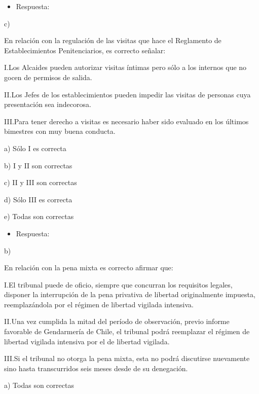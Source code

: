 \documentclass[letterpaper, 11pt]{article}
\begin{document}
\begin{itemize}
\item Respuesta:
\end{itemize}

c)


En relación con la regulación de las visitas que hace el Reglamento de
Establecimientos Penitenciarios, es correcto señalar:


I.Los Alcaides pueden autorizar visitas íntimas pero sólo a los
internos que no gocen de permisos de salida.



II.Los Jefes de los establecimientos pueden impedir las visitas de
personas cuya presentación sea indecorosa.



III.Para tener derecho a visitas es necesario haber sido evaluado en
los últimos bimestres con muy buena conducta.



a) Sólo I es correcta

b) I y II son correctas

c) II y III son correctas

d) Sólo III es correcta

e) Todas son correctas


\begin{itemize}
\item Respuesta:
\end{itemize}

b)



En relación con la pena mixta es correcto afirmar que:


I.El tribunal puede de oficio, siempre que concurran los requisitos
legales, disponer la interrupción de la pena privativa de libertad
originalmente impuesta, reemplazándola por el régimen de libertad
vigilada intensiva.



II.Una vez cumplida la mitad del período de observación, previo
informe favorable de Gendarmería de Chile, el tribunal podrá
reemplazar el régimen de libertad vigilada intensiva por el de
libertad vigilada.



III.Si el tribunal no otorga la pena mixta, esta no podrá discutirse
nuevamente sino hasta transcurridos seis meses desde de su denegación.




a) Todas son correctas
\end{document}
